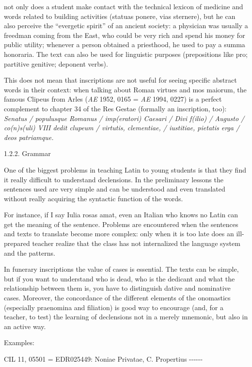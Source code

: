 \documentclass[amsthm,ebook]{saparticle}
\begin{document}
not only does a student make contact with the technical lexicon of medicine and words related to building activities
(statuas ponere, vias sternere), but he can also perceive the “evergetic spirit” of an ancient society: a physician was
usually a freedman coming from the East, who could be very rich and spend his money for public utility; whenever a
person obtained a priesthood, he used to pay a summa honoraria. The text can also be used for linguistic purposes
(prepositions like pro; partitive genitive; deponent verbs).

This does not mean that inscriptions are not useful for seeing specific abstract words in their context: when talking
about Roman virtues and mos maiorum, the famous Clipeus from Arles (\emph{AE} 1952, 0165 = \emph{AE} 1994, 0227) is a
perfect complement to chapter 34 of the Res Gestae (formally an inscription, too): \emph{Senatus / populusque Romanus /
imp(eratori) Caesari / Divi f(ilio) / Augusto / co(n)s(uli) VIII dedit clupeum / virtutis, clementiae, / iustitiae,
pietatis erga / deos patriamque.}


\bigskip

1.2.2. Grammar

One of the biggest problems in teaching Latin to young students is that they find it really difficult to understand
declensions. In the preliminary lessons the sentences used are very simple and can be understood and even translated
without really acquiring the syntactic function of the words.

For instance, if I say Iulia rosas amat, even an Italian who knows no Latin can get the meaning of the sentence.
Problems are encountered when the sentences and texts to translate become more complex: only when it is too late does
an ill-prepared teacher realize that the class has not internalized the language system and the patterns.

In funerary inscriptions the value of cases is essential. The texts can be simple, but if you want to understand who is
dead, who is the dedicant and what the relationship between them is, you have to distinguish dative and nominative
cases. Moreover, the concordance of the different elements of the onomastics (especially praenomina and filiation) is
good way to encourage (and, for a teacher, to test) the learning of declensions not in a merely mnemonic, but also in
an active way.

Examples:

\textwide{\FilledBigTriangleRight} CIL 11, 05501 = EDR025449: Noniae Privatae, C. Propertius -{}-{}-{}-{}-{}-
\end{document}
